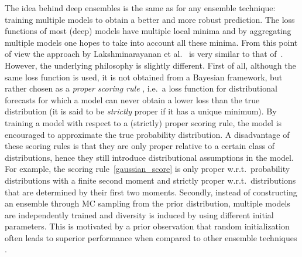 \documentclass[smallcondensed]{svjour3}
\begin{document}
    The idea behind deep ensembles \cite{lakshminarayanan2017simple} is the same as for any ensemble technique: training multiple models to obtain a better and more robust prediction. The loss functions of most (deep) models have multiple local minima and by aggregating multiple models one hopes to take into account all these minima. From this point of view the approach by Lakshminarayanan et al.~\cite{lakshminarayanan2017simple} is very similar to that of~\cite{kendallgal}. However, the underlying philosophy is slightly different. First of all, although the same loss function is used, it is not obtained from a Bayesian framework, but rather chosen as a \textit{proper scoring rule} \cite{gneiting2007strictly}, i.e.\ a loss function for distributional forecasts for which a model can never obtain a lower loss than the true distribution (it is said to be \textit{strictly} proper if it has a unique minimum). By training a model with respect to a (strictly) proper scoring rule, the model is encouraged to approximate the true probability distribution. A disadvantage of these scoring rules is that they are only proper relative to a certain class of distributions, hence they still introduce distributional assumptions in the model. For example, the scoring rule~\eqref{gaussian_score} is only proper w.r.t.\ probability distributions with a finite second moment and strictly proper w.r.t.\ distributions that are determined by their first two moments. Secondly, instead of constructing an ensemble through MC sampling from the prior distribution, multiple models are independently trained and diversity is induced by using different initial parameters. This is motivated by a prior observation that random initialization often leads to superior performance when compared to other ensemble techniques \cite{lee2015m}.
\end{document}
